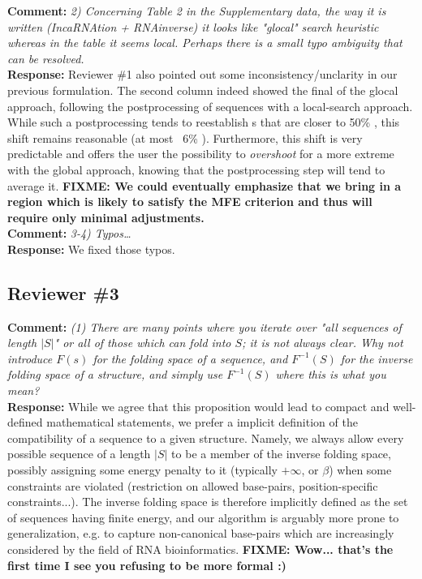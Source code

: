 \documentclass[11pt,hyperref,draft]{article} %
\newcommand{\Answer}[1]{\noindent\textsf{\textbf{Response: }}{\sf#1}\\}
\newcommand{\Comment}[1]{\noindent\textsf{\textbf{Comment: }}{\it#1}\\[.5em]}
\begin{document}
\Comment{2) Concerning Table 2 in the Supplementary data, the way it is written (IncaRNAtion + RNAinverse) it looks like "glocal" search heuristic whereas in the table it seems local. Perhaps there is a small typo ambiguity that can be resolved.}
\Answer{Reviewer \#1 also pointed out some inconsistency/unclarity in our previous formulation. The second column indeed showed the final \GCContent of the glocal approach, following the postprocessing of sequences with a local-search approach. While such a postprocessing tends to reestablish \GCContent{}s that are  closer to 50\% \GC, this shift remains reasonable (at most ~6\% \GC). Furthermore, this shift is very predictable and offers the user the possibility to \emph{overshoot} for a more extreme \GCContent with the global approach, knowing that the postprocessing step will tend to average it.
\textbf{FIXME: We could eventually emphasize that we bring \RNAinverse in a region which is likely to satisfy the  MFE criterion and thus will require only minimal adjustments.}}

\Comment{3-4) Typos\ldots}
\Answer{We fixed those typos.}

\subsection{Reviewer \#3}

\Comment{(1) There are many points where you iterate over "all sequences of length $|S|$" or all of those which can fold into $S$; it is not always clear. Why not introduce $F(s)$ for the folding space of a sequence, and $F^{-1}(S)$ for the inverse folding space of a structure, and simply use $F^{-1}(S)$ where this is what you mean?}
\Answer{While we agree that this proposition would lead to compact and well-defined mathematical statements, we prefer a implicit definition of the compatibility of a sequence to a given structure. Namely, we always allow every possible sequence of a length $|S|$ to be a member of the inverse folding space, possibly assigning some  energy penalty to it  (typically $+\infty$, or $\beta$) when some constraints are violated (restriction on allowed base-pairs, position-specific constraints...). The inverse folding space is therefore implicitly defined as the set of sequences having finite energy, and our algorithm is arguably more prone to generalization, e.g. to capture non-canonical base-pairs which are increasingly considered by the field of RNA bioinformatics.
\textbf{FIXME: Wow... that's the first time I see you refusing to be more formal :) }
}
\end{document}
